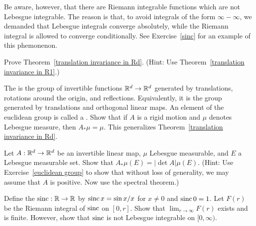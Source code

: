 Be aware, however, that there are Riemann integrable functions which are not Lebesgue integrable.
The reason is that, to avoid integrals of the form $\infty - \infty$, we demanded that Lebesgue integrals converge absolutely, while the Riemann integral is allowed to converge conditionally.
See Exercise~\ref{sinc} for an example of this phemonenon.

\begin{exercise}\label{translation invariance exer}
Prove Theorem~\ref{translation invariance in Rd}. (Hint: Use Theorem~\ref{translation invariance in R1}.)
\end{exercise}

\begin{exercise}\label{euclidean group}
The  is the group of invertible functions $\mathbb{R}^{d} \to \mathbb{R}^{d}$ generated by translations, rotations around the origin, and reflections. Equivalently, it is the group generated by translations and orthogonal linear maps.
An element of the euclidean group is called a . Show that if $A$ is a rigid motion and $\mu$ denotes Lebesgue measure, then $A_{*}\mu = \mu$.
This generalizes Theorem~\ref{translation invariance in Rd}.
\end{exercise}

\begin{exercise}
Let $A: \mathbb{R}^{d} \to \mathbb{R}^{d}$ be an invertible linear map, $\mu$ Lebesgue measurable, and $E$ a Lebesgue measurable set. Show that $A_{*}\mu(E) = |\det A|\mu(E)$.
(Hint: Use Exercise~\ref{euclidean group} to show that without loss of generality, we may assume that $A$ is positive. Now use the spectral theorem.)
\end{exercise}

\begin{exercise}\label{sinc}
Define the  $\operatorname{sinc}: \mathbb{R} \to \mathbb{R}$ by $\operatorname{sinc} x = \sin x/x$ for $x \neq 0$ and $\operatorname{sinc} 0 = 1$.
Let $F(r)$ be the Riemann integral of $\operatorname{sinc}$ on $[0, r]$. Show that $\lim_{r \to \infty} F(r)$ exists and is finite.
However, show that $\operatorname{sinc}$ is not Lebesgue integrable on $[0, \infty)$.
\end{exercise}

